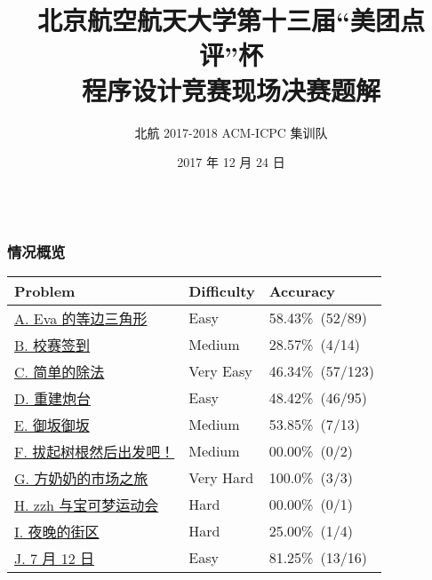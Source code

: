 \documentclass[notheorems]{beamer}
\newcommand{\zhProbA}{Eva 的等边三角形}	\newcommand{\DiffA}{Easy}		\newcommand{\AuthProbA}{\texttt{Dshawn}}		\newcommand{\TestProbA}{\texttt{chitanda}}
\newcommand{\zhProbB}{校赛签到}			\newcommand{\DiffB}{Medium}	\newcommand{\AuthProbB}{\texttt{coldwater}}	\newcommand{\TestProbB}{\texttt{chitanda}}
\newcommand{\zhProbC}{简单的除法}		\newcommand{\DiffC}{Very Easy}	\newcommand{\AuthProbC}{\texttt{yic}}			\newcommand{\TestProbC}{\texttt{skywalkert, chitanda, duhao110101}}
\newcommand{\zhProbD}{重建炮台}			\newcommand{\DiffD}{Easy}		\newcommand{\AuthProbD}{\texttt{quintessence}}	\newcommand{\TestProbD}{\texttt{zlc1114, chitanda, duhao110101}}
\newcommand{\zhProbE}{御坂御坂}			\newcommand{\DiffE}{Medium}	\newcommand{\AuthProbE}{\texttt{skywalkert}}	\newcommand{\TestProbE}{\texttt{chitanda}}
\newcommand{\zhProbF}{拔起树根然后出发吧！}\newcommand{\DiffF}{Medium}	\newcommand{\AuthProbF}{\texttt{ConnorZhong}}	\newcommand{\TestProbF}{\texttt{zlc1114}}
\newcommand{\zhProbG}{方奶奶的市场之旅}	\newcommand{\DiffG}{Very Hard}	\newcommand{\AuthProbG}{\texttt{ShinriiTin}}	\newcommand{\TestProbG}{\texttt{skywalkert}}
\newcommand{\zhProbH}{zzh 与宝可梦运动会}	\newcommand{\DiffH}{Hard}		\newcommand{\AuthProbH}{\texttt{zzh}}			\newcommand{\TestProbH}{\texttt{skywalkert}}
\newcommand{\zhProbI}{夜晚的街区}		\newcommand{\DiffI}{Hard}		\newcommand{\AuthProbI}{\texttt{Chielo}}		\newcommand{\TestProbI}{\texttt{skywalkert}}
\newcommand{\zhProbJ}{7 月 12 日}		\newcommand{\DiffJ}{Easy}		\newcommand{\AuthProbJ}{\texttt{Dshawn}}		\newcommand{\TestProbJ}{\texttt{skywalkert}}
\newcommand{\AccInProbA}{52}	\newcommand{\SubInProbA}{89}	\newcommand{\RatInProbA}{58.43\%}
\newcommand{\AccInProbB}{4}	\newcommand{\SubInProbB}{14}	\newcommand{\RatInProbB}{28.57\%}
\newcommand{\AccInProbC}{57}	\newcommand{\SubInProbC}{123}	\newcommand{\RatInProbC}{46.34\%}
\newcommand{\AccInProbD}{46}	\newcommand{\SubInProbD}{95}	\newcommand{\RatInProbD}{48.42\%}
\newcommand{\AccInProbE}{7}	\newcommand{\SubInProbE}{13}	\newcommand{\RatInProbE}{53.85\%}
\newcommand{\AccInProbF}{0}	\newcommand{\SubInProbF}{2}	\newcommand{\RatInProbF}{00.00\%}
\newcommand{\AccInProbG}{3}	\newcommand{\SubInProbG}{3}	\newcommand{\RatInProbG}{100.0\%}
\newcommand{\AccInProbH}{0}	\newcommand{\SubInProbH}{1}	\newcommand{\RatInProbH}{00.00\%}
\newcommand{\AccInProbI}{1}	\newcommand{\SubInProbI}{4}	\newcommand{\RatInProbI}{25.00\%}
\newcommand{\AccInProbJ}{13}	\newcommand{\SubInProbJ}{16}	\newcommand{\RatInProbJ}{81.25\%}
\begin{document}
\title[The 13th BCPC Final Round Solutions]{北京航空航天大学第十三届“美团点评”杯 \\ 程序设计竞赛现场决赛题解}
\author[Beihang University 2017-2018 ACM-ICPC Training Team]{北航 2017-2018 ACM-ICPC 集训队}
\date[December 24th, 2017]{2017 年 12 月 24 日}
{\frame{\titlepage}}

\begin{frame}[label = Overview]
\frametitle{\\ 情况概览}
\begin{center} \begin{spacing}{1.1}
\begin{tabular}{lll}
\toprule
Problem					&	Difficulty	&	Accuracy							\\
\midrule
\hyperlink{ProbA}{A. \zhProbA}	&	\DiffA	&	\RatInProbA\ (\AccInProbA/\SubInProbA)	\\
\hyperlink{ProbB}{B. \zhProbB}	&	\DiffB	&	\RatInProbB\ (\AccInProbB/\SubInProbB)	\\
\hyperlink{ProbC}{C. \zhProbC}	&	\DiffC	&	\RatInProbC\ (\AccInProbC/\SubInProbC)	\\
\hyperlink{ProbD}{D. \zhProbD}	&	\DiffD	&	\RatInProbD\ (\AccInProbD/\SubInProbD)	\\
\hyperlink{ProbE}{E. \zhProbE}	&	\DiffE	&	\RatInProbE\ (\AccInProbE/\SubInProbE)	\\
\hyperlink{ProbF}{F. \zhProbF}	&	\DiffF	&	\RatInProbF\ (\AccInProbF/\SubInProbF)	\\
\hyperlink{ProbG}{G. \zhProbG}	&	\DiffG	&	\RatInProbG\ (\AccInProbG/\SubInProbG)	\\
\hyperlink{ProbH}{H. \zhProbH}	&	\DiffH	&	\RatInProbH\ (\AccInProbH/\SubInProbH)	\\
\hyperlink{ProbI}{I. \zhProbI}	&	\DiffI	&	\RatInProbI\ (\AccInProbI/\SubInProbI)	\\
\hyperlink{ProbJ}{J. \zhProbJ}	&	\DiffJ	&	\RatInProbJ\ (\AccInProbJ/\SubInProbJ)	\\
\bottomrule
\end{tabular}
\end{spacing} \end{center}
\end{frame}
\end{document}
